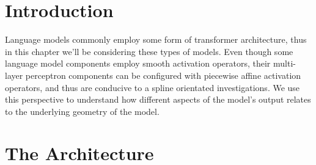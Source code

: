 \section{Introduction}

Language models commonly employ some form of transformer architecture, thus in this chapter we'll be considering these types of models. Even though some language model components employ smooth activation operators, their multi-layer perceptron components can be configured with piecewise affine activation operators, and thus are conducive to a spline orientated investigations. We use this perspective to understand how different aspects of the model's output relates to the underlying geometry of the model.

\section{The Architecture}\label{sec:architecture}

